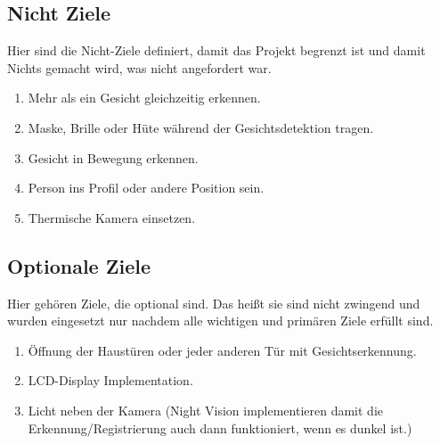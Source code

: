 \subsection{Nicht Ziele}
Hier sind die Nicht-Ziele definiert, damit das Projekt begrenzt ist und damit Nichts gemacht wird, was nicht angefordert war.

\begin{enumerate}
	\item Mehr als ein Gesicht gleichzeitig erkennen.
	
	\item Maske, Brille oder Hüte w\"ahrend der Gesichtsdetektion tragen.
	
	\item Gesicht in Bewegung erkennen.
	
	\item Person ins Profil oder andere Position sein.
	
	\item Thermische Kamera einsetzen.
	
	
\end{enumerate}
\subsection{Optionale Ziele}
Hier gehören Ziele, die optional sind. Das heißt sie sind nicht zwingend und wurden eingesetzt nur nachdem alle wichtigen und primären Ziele erfüllt sind.

\begin{enumerate}
	
	
	\item Öffnung der Haustüren oder jeder anderen Tür mit Gesichtserkennung.
	
	\item LCD-Display Implementation.
	
	\item Licht neben der Kamera (Night Vision implementieren damit die Erkennung/Registrierung auch dann funktioniert, wenn es dunkel ist.)
\end{enumerate}


